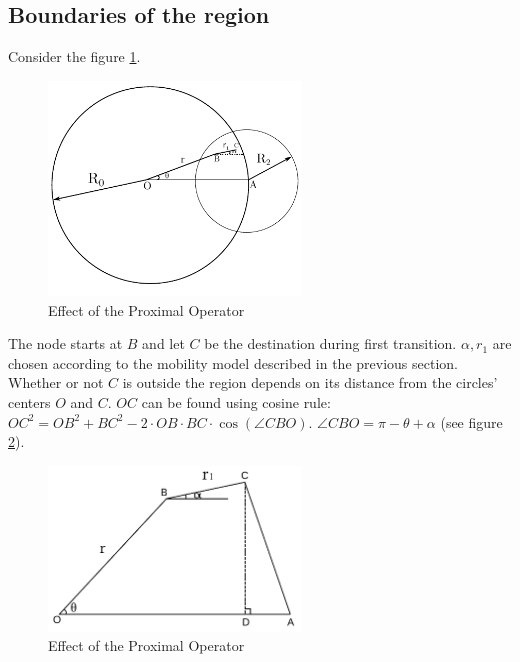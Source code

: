 \subsection{Boundaries of the region}
Consider the figure \ref{fig:rr1}. 
\begin{figure}[h]
    \centering \vspace{-0.1in}
    \includegraphics[width=0.6\textwidth]{images/geo1.pdf}
    \vspace{-20pt} \caption[Effect of the proximal Operator]{\small Effect of the Proximal Operator }
    \label{fig:rr1}
\end{figure}
The node starts at $B$ and let $C$ be 
the destination during first transition. $\alpha, r_1$ are chosen according to the mobility 
model described in the previous section. Whether or not $C$ is outside the region depends on
its distance from the circles' centers $O$ and $C$. $OC$ can be found using cosine rule:
$OC^2 = OB^2 + BC^2 - 2 \cdot OB \cdot BC \cdot \cos(\angle CBO)$. $\angle CBO = \pi-\theta+\alpha$ (see figure \ref{fig:ocac}).
\begin{figure}[h]
    \centering \vspace{-0.1in}
    \includegraphics[width=0.6\textwidth]{images/geo2.pdf}
    \vspace{-20pt} \caption[Effect of the proximal Operator]{\small Effect of the Proximal Operator }
    \label{fig:ocac}
\end{figure}

